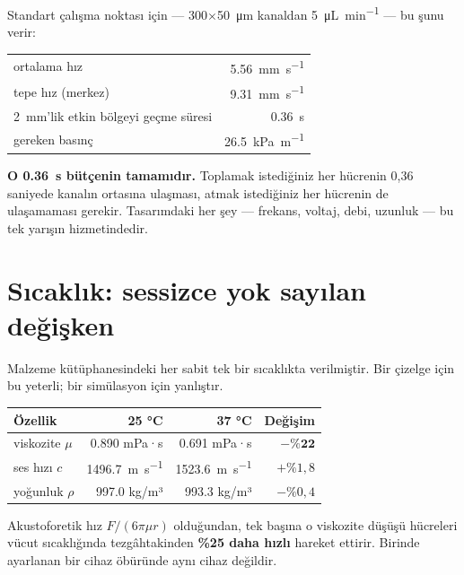 \documentclass[11pt,a4paper]{article}
\begin{document}
Standart çalışma noktası için --- \SI{300}{}$\times$\SI{50}{\micro\meter}
kanaldan \SI{5}{\micro\liter\per\minute} --- bu şunu verir:

\begin{center}\small
\begin{tabular}{lr}
\toprule
ortalama hız & \SI{5,56}{\milli\meter\per\second} \\
tepe hız (merkez) & \SI{9,31}{\milli\meter\per\second} \\
\SI{2}{\milli\meter}'lik etkin bölgeyi geçme süresi & \SI{0,36}{\second} \\
gereken basınç & \SI{26,5}{\kilo\pascal\per\meter} \\
\bottomrule
\end{tabular}
\end{center}

\textbf{O \SI{0,36}{\second} bütçenin tamamıdır.} Toplamak istediğiniz her
hücrenin 0,36 saniyede kanalın ortasına ulaşması, atmak istediğiniz her hücrenin
de ulaşamaması gerekir. Tasarımdaki her şey --- frekans, voltaj, debi, uzunluk
--- bu tek yarışın hizmetindedir.

\section{Sıcaklık: sessizce yok sayılan değişken}
\label{sec:temperature}

Malzeme kütüphanesindeki her sabit tek bir sıcaklıkta verilmiştir. Bir çizelge
için bu yeterli; bir simülasyon için yanlıştır.

\begin{center}\small
\begin{tabular}{lrrr}
\toprule
\textbf{Özellik} & \textbf{25 °C} & \textbf{37 °C} & \textbf{Değişim} \\
\midrule
viskozite $\mu$ & \SI{0,890}{} mPa·s & \SI{0,691}{} mPa·s & $\mathbf{-\%22}$ \\
ses hızı $c$ & \SI{1496,7}{\meter\per\second} & \SI{1523,6}{\meter\per\second} & $+\%1{,}8$ \\
yoğunluk $\rho$ & \SI{997,0}{} kg/m³ & \SI{993,3}{} kg/m³ & $-\%0{,}4$ \\
\bottomrule
\end{tabular}
\end{center}

Akustoforetik hız $F/(6\pi\mu r)$ olduğundan, tek başına o viskozite düşüşü
hücreleri vücut sıcaklığında tezgâhtakinden \textbf{\%25 daha hızlı} hareket
ettirir. Birinde ayarlanan bir cihaz öbüründe aynı cihaz değildir.
\end{document}
